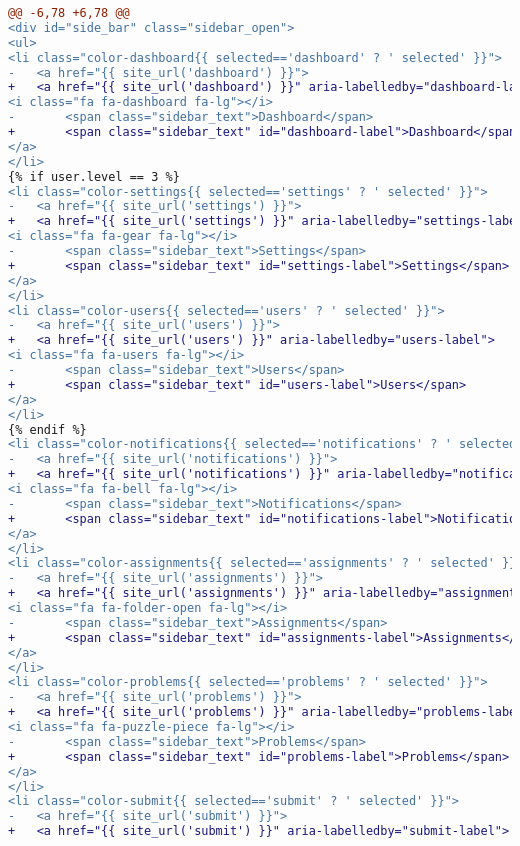 \begin{itemize}
\begin{lstlisting}[language=diff, caption=Perubahan pada \textit{file} \textit{side\_bar.twig}, label=lst_2.4.4:1, basicstyle=\ttfamily, frame=single,
columns=fullflexible, keepspaces=true, breaklines=true]
@@ -6,78 +6,78 @@
<div id="side_bar" class="sidebar_open">
<ul>
<li class="color-dashboard{{ selected=='dashboard' ? ' selected' }}">
- 	<a href="{{ site_url('dashboard') }}">
+ 	<a href="{{ site_url('dashboard') }}" aria-labelledby="dashboard-label">
<i class="fa fa-dashboard fa-lg"></i>
- 		<span class="sidebar_text">Dashboard</span>
+ 		<span class="sidebar_text" id="dashboard-label">Dashboard</span>
</a>
</li>
{% if user.level == 3 %}
<li class="color-settings{{ selected=='settings' ? ' selected' }}">
- 	<a href="{{ site_url('settings') }}">
+ 	<a href="{{ site_url('settings') }}" aria-labelledby="settings-label">
<i class="fa fa-gear fa-lg"></i>
- 		<span class="sidebar_text">Settings</span>
+ 		<span class="sidebar_text" id="settings-label">Settings</span>
</a>
</li>
<li class="color-users{{ selected=='users' ? ' selected' }}">
- 	<a href="{{ site_url('users') }}">
+ 	<a href="{{ site_url('users') }}" aria-labelledby="users-label">
<i class="fa fa-users fa-lg"></i>
- 		<span class="sidebar_text">Users</span>
+ 		<span class="sidebar_text" id="users-label">Users</span>
</a>
</li>
{% endif %}
<li class="color-notifications{{ selected=='notifications' ? ' selected' }}">
- 	<a href="{{ site_url('notifications') }}">
+ 	<a href="{{ site_url('notifications') }}" aria-labelledby="notifications-label">
<i class="fa fa-bell fa-lg"></i>
- 		<span class="sidebar_text">Notifications</span>
+ 		<span class="sidebar_text" id="notifications-label">Notifications</span>
</a>
</li>
<li class="color-assignments{{ selected=='assignments' ? ' selected' }}">
- 	<a href="{{ site_url('assignments') }}">
+ 	<a href="{{ site_url('assignments') }}" aria-labelledby="assignments-label">
<i class="fa fa-folder-open fa-lg"></i>
- 		<span class="sidebar_text">Assignments</span>
+ 		<span class="sidebar_text" id="assignments-label">Assignments</span>
</a>
</li>
<li class="color-problems{{ selected=='problems' ? ' selected' }}">
- 	<a href="{{ site_url('problems') }}">
+ 	<a href="{{ site_url('problems') }}" aria-labelledby="problems-label">
<i class="fa fa-puzzle-piece fa-lg"></i>
- 		<span class="sidebar_text">Problems</span>
+ 		<span class="sidebar_text" id="problems-label">Problems</span>
</a>
</li>
<li class="color-submit{{ selected=='submit' ? ' selected' }}">
- 	<a href="{{ site_url('submit') }}">
+ 	<a href="{{ site_url('submit') }}" aria-labelledby="submit-label">

\end{lstlisting}
\end{itemize}
